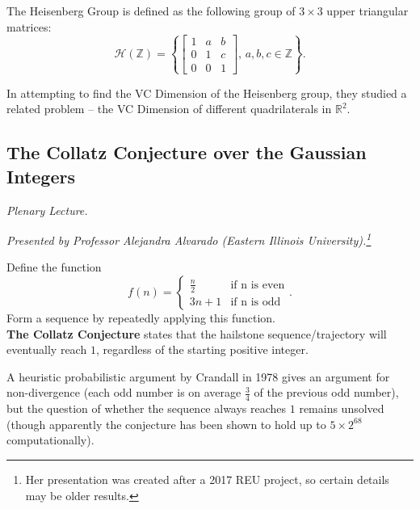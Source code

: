 \documentclass[12pt]{amsart}
\begin{document}
\begin{definition}
The Heisenberg Group is defined as the following group of $3 \times 3$ upper triangular matrices: \[\mathcal{H}(\mathbb{Z}) = \left \{\begin{bmatrix} 1 & a & b \\ 0 & 1 & c \\ 0 & 0 & 1\end{bmatrix}, \, a, b, c \in \mathbb{Z} \right\}.\]
\end{definition}

\begin{result*}
In attempting to find the VC Dimension of the Heisenberg group, they studied a related problem -- the VC Dimension of different quadrilaterals in $\mathbb{R}^2$.
\end{result*}

\newpage

\subsection{The Collatz Conjecture over the Gaussian Integers}

\textit{Plenary Lecture.}
\vspace{0.25cm}

\textit{Presented by Professor Alejandra Alvarado (Eastern Illinois University).\footnote{Her presentation was created after a 2017 REU project, so certain details may be older results.}}

\begin{definition}
Define the function \[ f(n) = \begin{cases}\frac{n}{2} & \text{if n is even} \\ 3n + 1 & \text{if n is odd} \end{cases}.\]
Form a sequence by repeatedly applying this function. \\

\textbf{The Collatz Conjecture} states that the hailstone sequence/trajectory will eventually reach $1$, regardless of the starting positive integer.
\end{definition}

\vspace{0.25cm}

A heuristic probabilistic argument by Crandall in 1978 gives an argument for non-divergence (each odd number is on average $\frac{3}{4}$ of the previous odd number), but the question of whether the sequence always reaches $1$ remains unsolved (though apparently the conjecture has been shown to hold up to $5 \times 2^{68}$ computationally). \\
\end{document}

